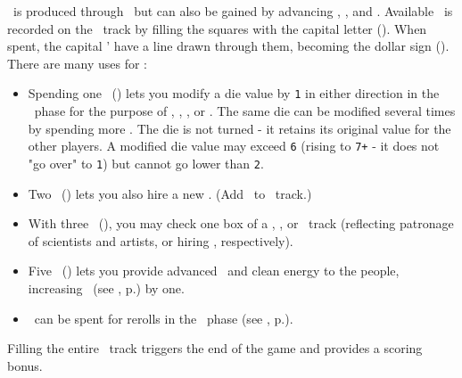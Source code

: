 \currency\ is produced through \factories\ but can also be gained by advancing \trade, \tech, and \culture.  
Available \currency\ is recorded on the \currency\ track by filling the squares with the capital letter (\gaincurrency). 
When spent, the capital \gaincurrency' have a line drawn through them, becoming the dollar sign (\spendcurrency).
There are many uses for \currency:
\begin{itemize}
  \item Spending one \currency\ (\spendcurrency) lets you modify a die value by \texttt{1} in either direction in the \development\ phase for the purpose of \construction, \activation, \trade, or \culture.  The same die can be modified several times by spending more \currency.  The die is not turned - it retains its original value for the other players.  A modified die value may exceed \texttt{6} (rising to \texttt{7+} - it does not "go over" to \texttt{1}) but cannot go lower than \texttt{2}.
  \item Two \currency\ (\spendcurrency\spendcurrency) lets you also hire a new \astronaut.  (Add \gainastronautsymbol\ to \population\ track.)
  \item With three \currency\ (\spendcurrency\spendcurrency\spendcurrency), you may check one box of a \tech, \culture, or \military\ track (reflecting patronage of scientists and artists, or hiring \pilots, respectively).
  \item Five \currency\ (\spendcurrency\spendcurrency\spendcurrency\spendcurrency\spendcurrency) lets you provide advanced \tech\ and clean energy to the people, increasing \happiness\ (see , p.\pageref{sec:happiness}) by one.
  \item \currency\ can be spent for rerolls in the \diplomacy\ phase (see , p.\pageref{sec:diplomacy}).
\end{itemize}
Filling the entire \currency\ track triggers the end of the game and provides a scoring bonus.

